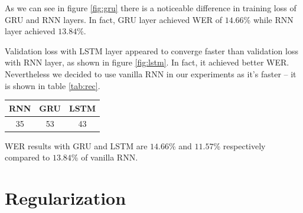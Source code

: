 \documentclass[licencjacka,en]{pracamgr}
\begin{document}
	\noindent
	As we can see in figure \ref{fig:gru} there is a noticeable difference in training loss of GRU and RNN layers. In fact, GRU layer achieved WER of $14.66$\% while RNN layer achieved $13.84$\%.
	\\
	
	\noindent%
	\begin{minipage}{\linewidth}%
		\label{fig:lstm}		     
	\end{minipage}
	
	Validation loss with LSTM layer appeared to converge faster than validation loss with RNN layer, as shown in figure \ref{fig:lstm}. In fact, it achieved better WER. Nevertheless we decided to use vanilla RNN in our experiments as it's faster -- it is shown in table \ref{tab:rec}.
	
	{
		\centering
		\begin{tabular}{|c|c|c|}
			\hline
			RNN & GRU & LSTM \\
			\hline
			\hline
			35 & 53 & 43 \\
			\hline
		\end{tabular}
		\label{tab:rec}
	}
	
	WER results with GRU and LSTM are $14.66$\% and $11.57$\% respectively compared to $13.84$\% of vanilla RNN.
	
	
	\section{Regularization}
\end{document}

